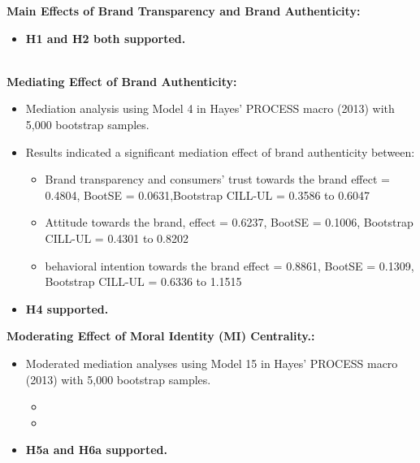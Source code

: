 \documentclass[a0,portrait]{a0poster}
\begin{document}
\begin{minipage}[c]{\linewidth}
\begin{framed}
\begin{multicols}{2}
\color{Maroon}
\textbf{Main Effects of Brand Transparency and Brand Authenticity:}\color{Black} \begin{itemize}
    \item \textbf{ H1 and H2 both supported.}
\end{itemize}
\\
\color{Maroon}
\textbf{Mediating Effect of Brand Authenticity:}\color{Black} \begin{itemize}
    \item Mediation analysis using Model 4 in Hayes’ PROCESS macro (2013) with 5,000 bootstrap samples.
    \item Results indicated a significant mediation effect of brand authenticity between:
    \begin{itemize}
        \item Brand transparency and consumers’ trust towards the brand effect = 0.4804, BootSE = 0.0631,Bootstrap CILL-UL = 0.3586 to 0.6047
        \item Attitude towards the brand, effect = 0.6237, BootSE = 0.1006, Bootstrap CILL-UL = 0.4301 to 0.8202
        \item behavioral intention towards the brand effect = 0.8861, BootSE = 0.1309, Bootstrap CILL-UL = 0.6336 to 1.1515
    \end{itemize}
    \item \textbf{H4 supported.}
\end{itemize}

\color{Maroon}
\textbf{Moderating Effect of Moral Identity (MI) Centrality.:}\color{Black} \begin{itemize}
    \item Moderated mediation analyses using Model 15 in Hayes’ PROCESS macro (2013) with 5,000 bootstrap samples.
    \begin{itemize}
        \item
        \item 
    \end{itemize}
    \item \textbf{H5a and H6a supported.}
\end{itemize}


\end{multicols}
\end{framed}
\end{minipage}
\end{document}
